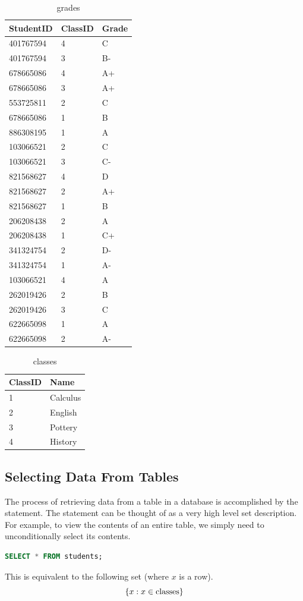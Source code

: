 \begin{problem}
\begin{table}[H]
\begin{tabular}{|l|l|l|}
\hline
StudentID & ClassID & Grade \\
\hline
401767594 & 4 & C \\
401767594 & 3 & B- \\
678665086 & 4 & A+ \\
678665086 & 3 & A+ \\
553725811 & 2 & C \\
678665086 & 1 & B \\
886308195 & 1 & A \\
103066521 & 2 & C \\
103066521 & 3 & C- \\
821568627 & 4 & D \\
821568627 & 2 & A+ \\
821568627 & 1 & B \\
206208438 & 2 & A \\
206208438 & 1 & C+ \\
341324754 & 2 & D- \\
341324754 & 1 & A- \\
103066521 & 4 & A \\
262019426 & 2 & B \\
262019426 & 3 & C \\
622665098 & 1 & A \\
622665098 & 2 & A- \\
\hline
\end{tabular}
\caption{grades}
\end{table}

\begin{table}[H]
\begin{tabular}{|l|l|}
\hline
ClassID & Name \\
\hline
1 & Calculus \\
2 & English \\
3 & Pottery \\
4 & History \\
\hline
\end{tabular}
\caption{classes}
\end{table}
\label{prob:sampletables}
\end{problem}


\subsection*{Selecting Data From Tables}
The process of retrieving data from a table in a database is accomplished by the  statement.
The  statement can be thought of as a very high level set description.
For example, to view the contents of an entire table, we simply need to unconditionally select its contents.
\begin{lstlisting}[language=SQL]
SELECT * FROM students;
\end{lstlisting}
This is equivalent to the following set (where $x$ is a row).
\[ \lbrace x:x \in \text{classes}\rbrace \]

